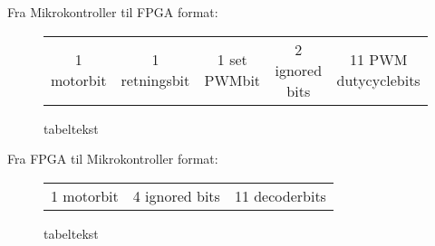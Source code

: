   
Fra Mikrokontroller til FPGA format:
\begin{figure}[th!]
\centering
\begin{tabular}{c|c|c|c|c}
1 motorbit &1 retningsbit & 1 set PWMbit & 2 ignored bits & 11 PWM dutycyclebits
\end{tabular}
\captionsetup{type=figure}
\caption[tekst i indholdsfortegnelsen]{tabeltekst}
\label{tb:protokol1}
\end{figure}

   
  
  Fra FPGA til Mikrokontroller format:
 \begin{figure}[th!]
 \centering
 \begin{tabular}{c|c|c}
 1 motorbit & 4 ignored bits & 11 decoderbits
  
 \end{tabular}
 \captionsetup{type=figure}
 \caption[tekst i indholdsfortegnelsen]{tabeltekst}
 \label{tb:protokol2}
 \end{figure}

